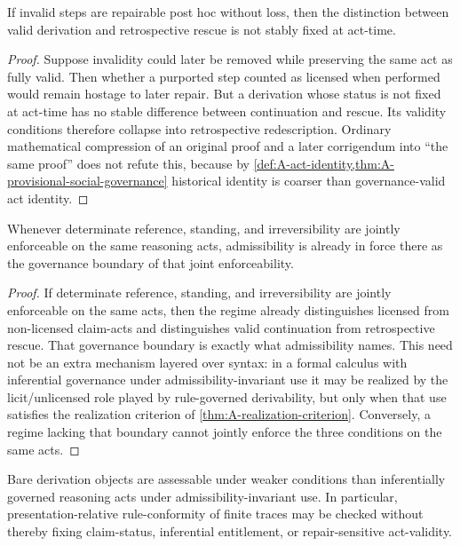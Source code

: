 \begin{lemma}
\label{lem:A-irreversibility}
If invalid steps are repairable post hoc without loss, then the distinction between valid derivation and retrospective rescue is not stably fixed at act-time.
\end{lemma}

\begin{proof}
Suppose invalidity could later be removed while preserving the same act as fully valid. Then whether a purported step counted as licensed when performed would remain hostage to later repair. But a derivation whose status is not fixed at act-time has no stable difference between continuation and rescue. Its validity conditions therefore collapse into retrospective redescription. Ordinary mathematical compression of an original proof and a later corrigendum into ``the same proof'' does not refute this, because by \cref{def:A-act-identity,thm:A-provisional-social-governance} historical identity is coarser than governance-valid act identity.
\end{proof}

\begin{lemma}
\label{lem:A-adm-boundary}
Whenever determinate reference, standing, and irreversibility are jointly enforceable on the same reasoning acts, admissibility is already in force there as the governance boundary of that joint enforceability.
\end{lemma}

\begin{proof}
If determinate reference, standing, and irreversibility are jointly enforceable on the same acts, then the regime already distinguishes licensed from non-licensed claim-acts and distinguishes valid continuation from retrospective rescue. That governance boundary is exactly what admissibility names. This need not be an extra mechanism layered over syntax: in a formal calculus with inferential governance under admissibility-invariant use it may be realized by the licit/unlicensed role played by rule-governed derivability, but only when that use satisfies the realization criterion of \cref{thm:A-realization-criterion}. Conversely, a regime lacking that boundary cannot jointly enforce the three conditions on the same acts.
\end{proof}

\begin{theorem}
\label{thm:A-bare-trace-assessability}
Bare derivation objects are assessable under weaker conditions than inferentially governed reasoning
acts under admissibility-invariant use. In particular, presentation-relative rule-conformity of finite traces may be checked without
thereby fixing claim-status, inferential entitlement, or repair-sensitive act-validity.
\end{theorem}

